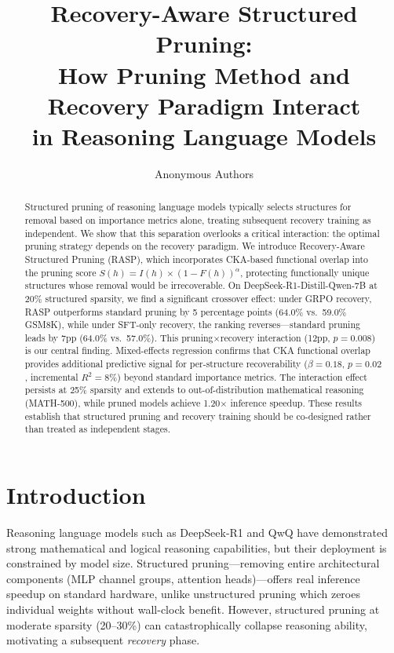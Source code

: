\documentclass[11pt]{article}
\title{Recovery-Aware Structured Pruning: \\How Pruning Method and Recovery Paradigm Interact \\in Reasoning Language Models}
\author{
  Anonymous Authors
}
\date{}
\begin{document}
\maketitle

\begin{abstract}
Structured pruning of reasoning language models typically selects structures for removal based on importance metrics alone, treating subsequent recovery training as independent. We show that this separation overlooks a critical interaction: the optimal pruning strategy depends on the recovery paradigm. We introduce Recovery-Aware Structured Pruning (RASP), which incorporates CKA-based functional overlap into the pruning score $S(h) = I(h) \times (1 - F(h))^\alpha$, protecting functionally unique structures whose removal would be irrecoverable. On DeepSeek-R1-Distill-Qwen-7B at 20\% structured sparsity, we find a significant crossover effect: under GRPO recovery, RASP outperforms standard pruning by 5 percentage points (64.0\% vs.\ 59.0\% GSM8K), while under SFT-only recovery, the ranking reverses---standard pruning leads by 7pp (64.0\% vs.\ 57.0\%). This pruning$\times$recovery interaction (12pp, $p{=}0.008$) is our central finding. Mixed-effects regression confirms that CKA functional overlap provides additional predictive signal for per-structure recoverability ($\beta{=}0.18$, $p{=}0.02$, incremental $R^2{=}8\%$) beyond standard importance metrics. The interaction effect persists at 25\% sparsity and extends to out-of-distribution mathematical reasoning (MATH-500), while pruned models achieve 1.20$\times$ inference speedup. These results establish that structured pruning and recovery training should be co-designed rather than treated as independent stages.
\end{abstract}

\section{Introduction}
\label{sec:intro}

Reasoning language models such as DeepSeek-R1 and QwQ have demonstrated strong mathematical and logical reasoning capabilities, but their deployment is constrained by model size. Structured pruning---removing entire architectural components (MLP channel groups, attention heads)---offers real inference speedup on standard hardware, unlike unstructured pruning which zeroes individual weights without wall-clock benefit. However, structured pruning at moderate sparsity (20--30\%) can catastrophically collapse reasoning ability, motivating a subsequent \emph{recovery} phase.
\end{document}
